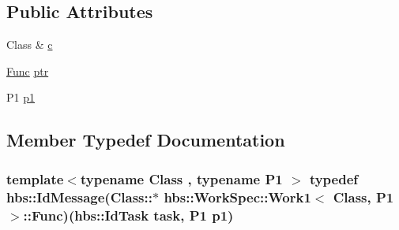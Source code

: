 \subsection*{Public Attributes}
\begin{DoxyCompactItemize}
\item 
Class \& \hyperlink{structhbs_1_1_work_spec_1_1_work1_a8b8aff633b8cf8ffdff68d89aa3d722d}{c}
\item 
\hyperlink{structhbs_1_1_work_spec_1_1_work1_af6366a85e83cfa25360693d314dace5b}{Func} \hyperlink{structhbs_1_1_work_spec_1_1_work1_aae1ee8d342b1492d889253439d256b83}{ptr}
\item 
P1 \hyperlink{structhbs_1_1_work_spec_1_1_work1_ab06fc99d119bd4db78a0755de8bce3a5}{p1}
\end{DoxyCompactItemize}


\subsection{Member Typedef Documentation}
\hypertarget{structhbs_1_1_work_spec_1_1_work1_af6366a85e83cfa25360693d314dace5b}{
\subsubsection[{Func}]{\setlength{\rightskip}{0pt plus 5cm}template$<$typename Class , typename P1 $>$ typedef {\bf hbs\-::\-Id\-Message}(Class\-::$\ast$ {\bf hbs\-::\-Work\-Spec\-::\-Work1}$<$ Class, P1 $>$\-::Func)({\bf hbs\-::\-Id\-Task} task, P1 {\bf p1})}}\label{structhbs_1_1_work_spec_1_1_work1_af6366a85e83cfa25360693d314dace5b}


